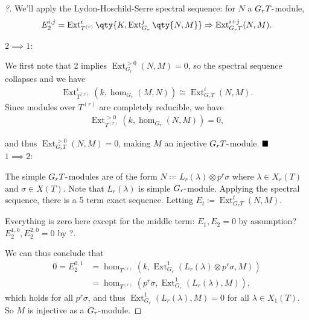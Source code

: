\begin{proof}[?]

We'll apply the Lydon-Hoschild-Serre spectral sequence: for \(N\) a
\(G_r T{\hbox{-}}\)module,
\begin{align*}  
E_2^{i, j} = \operatorname{Ext}_{T^{(r)}}^{i}\qty{K, \operatorname{Ext}_{G_r}^j\qty{N, M} } \Rightarrow\operatorname{Ext}_{G_r T}^{i+j}(N, M)
.\end{align*}

\(2\implies 1\):

We first note that 2 implies
\(\operatorname{Ext}_{G_r}^{>0}(N, M) = 0\), so the spectral sequence
collapses and we have
\begin{align*}  
\operatorname{Ext}_{T^{(r)}}^i (k, \hom_{G_r}(M, N) ) \cong \operatorname{Ext}_{G_r T}^i(N, M)
.\end{align*}
Since modules over \(T^{(r)}\) are completely reducible, we have
\begin{align*}  
\operatorname{Ext}_{T^{(r)}}^{>0} ( k, \hom_{G_r}(N, M) ) = 0
,\end{align*}

and thus \(\operatorname{Ext}_{G_r T}^{>0}(N, M) = 0\), making \(M\) an
injective \(G_r T{\hbox{-}}\)module. \(\hfill\blacksquare\)\\

\(1\implies 2\):

The simple \(G_r T{\hbox{-}}\)modules are of the form
\(N\coloneqq L_r(\lambda) \otimes p^r\sigma\) where
\(\lambda\in X_r(T)\) and \(\sigma\in X(T)\). Note that \(L_r(\lambda)\)
is simple \(G_r{\hbox{-}}\)module. Applying the spectral sequence, there
is a 5 term exact sequence. Letting
\(E_t \coloneqq\operatorname{Ext}_{G_rT}^t (N, M)\).

\begin{center}
\end{center}

Everything is zero here except for the middle term: \(E_1, E_2 = 0\) by
assumption? \(E_2^{1, 0}, E_2^{2, 0} = 0\) by ?.

We can thus conclude that
\begin{align*}  
0 = E_2^{0, 1}
&= \hom_{T^{(r)}}(k, \operatorname{Ext}_{G_r}^1 (L_r(\lambda) \otimes p^r\sigma, M)  ) \\ 
&= \hom_{T^{(r)}}(p^r\sigma, \operatorname{Ext}_{G_r}^1 (L_r(\lambda), M)  ) 
,\end{align*}
which holds for all \(p^r \sigma\), and thus
\(\operatorname{Ext}_{G_r}^1 (L_r(\lambda), M) = 0\) for all
\(\lambda\in X_1(T)\). So \(M\) is injective as a
\(G_r{\hbox{-}}\)module.

\end{proof}

